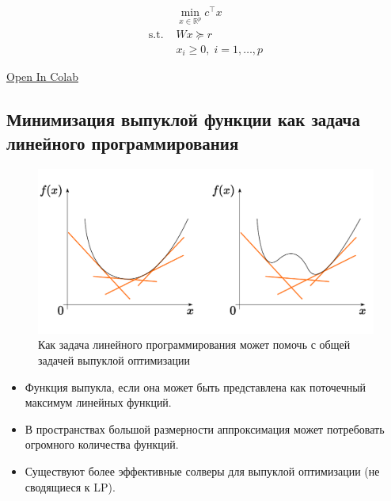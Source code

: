 \documentclass[
  russian,
  letterpaper,
  DIV=11,
  numbers=noendperiod]{scrartcl}
\providecommand{\tightlist}{%
  \setlength{\itemsep}{0pt}\setlength{\parskip}{0pt}}
\begin{document}
\[
\begin{split}
&\min_{x \in \mathbb{R}^p} c^{\top}x \\
\text{s.t. } & Wx \succeq r\\
& x_i \geq 0, \; i = 1,\dots, p
\end{split}
\]

\href{https://colab.research.google.com/github/MerkulovDaniil/optim/blob/master/assets/Notebooks/LP.ipynb\#scrollTo=fpT9Ywy5obfu}{\faPython Open
In Colab}

\subsection{Минимизация выпуклой функции как задача линейного
программирования}\label{ux43cux438ux43dux438ux43cux438ux437ux430ux446ux438ux44f-ux432ux44bux43fux443ux43aux43bux43eux439-ux444ux443ux43dux43aux446ux438ux438-ux43aux430ux43a-ux437ux430ux434ux430ux447ux430-ux43bux438ux43dux435ux439ux43dux43eux433ux43e-ux43fux440ux43eux433ux440ux430ux43cux43cux438ux440ux43eux432ux430ux43dux438ux44f}

\begin{figure}[H]

{\centering \includegraphics[width=0.75\linewidth,height=\textheight,keepaspectratio]{convex_via_LP.pdf}

}

\caption{Как задача линейного программирования может помочь с общей
задачей выпуклой оптимизации}

\end{figure}%

\begin{itemize}
\tightlist
\item
  Функция выпукла, если она может быть представлена как поточечный
  максимум линейных функций.
\item
  В пространствах большой размерности аппроксимация может потребовать
  огромного количества функций.
\item
  Существуют более эффективные солверы для выпуклой оптимизации (не
  сводящиеся к LP).
\end{itemize}
\end{document}
